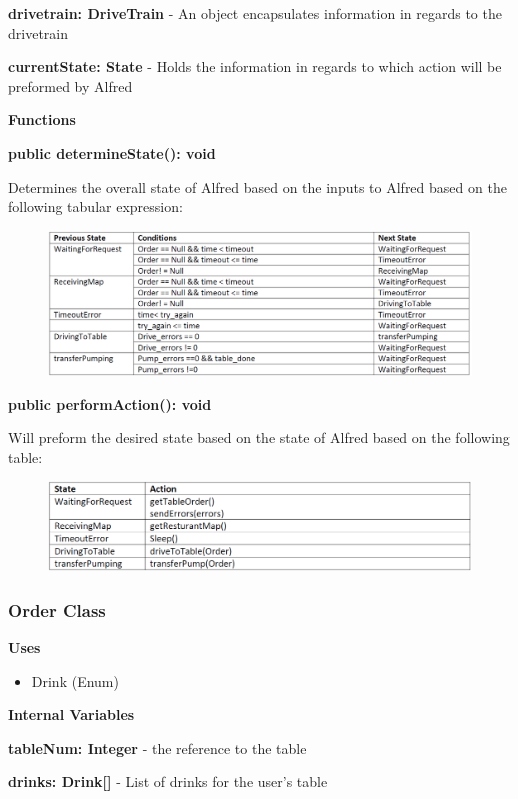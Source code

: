 \documentclass [10pt]{article}
\begin{document}
\textbf{drivetrain: DriveTrain} - An object encapsulates information in regards to the drivetrain

\textbf{currentState: State} - Holds the information in regards to which action will be preformed by Alfred


\textbf{Functions}

\textbf{public determineState(): void}

Determines the overall state of Alfred based on the inputs to Alfred based on the following tabular expression:
\begin{figure} [h!]
	\centering
	\includegraphics [scale = 0.4] {figures/AlfredSystem_DetermineState.png}
\end{figure}


\textbf{public performAction(): void}

Will preform the desired state based on the state of Alfred based on the following table:
\begin{figure} [h!]
	\centering
	\includegraphics [scale = 0.4] {figures/AlfredSystem_PerformAction.png}
\end{figure}
\subsubsection{Order Class}
\textbf{Uses}
\begin{itemize}
	\item Drink (Enum)
\end{itemize}


\textbf{Internal Variables}

\textbf{tableNum: Integer} - the reference to the table

\textbf{drinks: Drink[]} - List of drinks for the user's table
\end{document}
